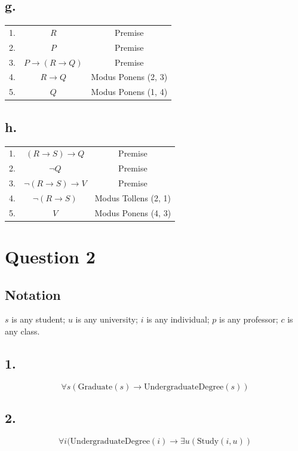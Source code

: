 \documentclass[12pt, a4paper]{article}
\begin{document}
\subsection*{g.}
\begin{tabular}{ccc}
1. & $R$ & Premise \\
2. & $P$ & Premise \\
3. & $P \rightarrow (R \rightarrow Q)$ & Premise \\
4. & $R \rightarrow Q$ & Modus Ponens (2, 3) \\
5. & $Q$ & Modus Ponens (1, 4) \\
\end{tabular}

\subsection*{h.}
\begin{tabular}{ccc}
1. & $(R \rightarrow S) \rightarrow Q$ & Premise \\
2. & $\lnot Q$ & Premise \\
3. & $\lnot (R \rightarrow S) \rightarrow V$ & Premise \\
4. & $\lnot (R \rightarrow S)$ & Modus Tollens (2, 1) \\
5. & $V$ & Modus Ponens (4, 3) \\
\end{tabular}

\newpage
\section*{Question 2}
\subsection*{Notation}
$s$ is any student;
$u$ is any university;
$i$ is any individual;
$p$ is any professor;
$c$ is any class.

\subsection*{1.}
$$\forall s(\text{Graduate}(s) \rightarrow \text{UndergraduateDegree}(s))$$

\subsection*{2.}
$$\forall i(\text{UndergraduateDegree}(i) \rightarrow \exists u(\text{Study}(i, u))$$
\end{document}
